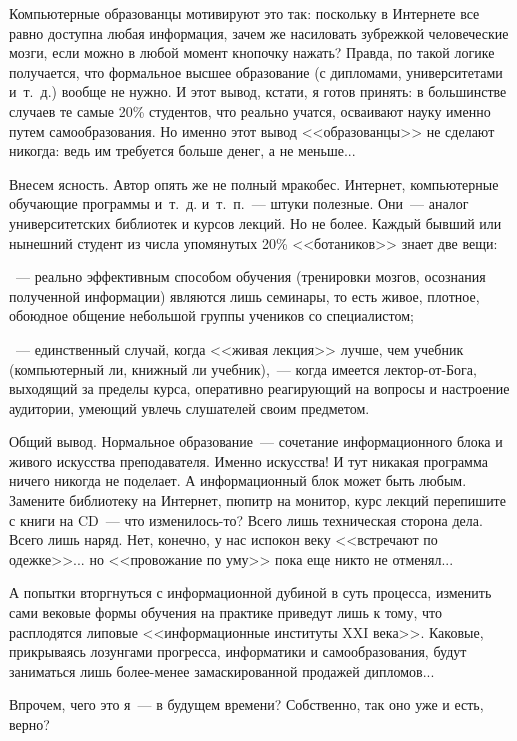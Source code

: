 \documentclass{scrbook}
\newcommand{\flqq}{<<}
\newcommand{\frqq}{>>}
\newcommand{\mdash}{~--- }
\newcommand{\commamdash}{~--- } %
\begin{document}
Компьютерные образованцы мотивируют это так: поскольку в Интернете все равно доступна любая информация, зачем же насиловать зубрежкой человеческие мозги, если можно в любой момент кнопочку нажать? Правда, по такой логике получается, что формальное высшее образование (с дипломами, университетами и~т.~д.) вообще не нужно. И этот вывод, кстати, я готов принять: в большинстве случаев те самые 20\% студентов, что реально учатся, осваивают науку именно путем самообразования. Но именно этот вывод {\flqq}образованцы{\frqq} не сделают никогда: ведь им требуется больше денег, а не меньше...

Внесем ясность. Автор опять же не полный мракобес. Интернет, компьютерные обучающие программы и~т.~д. и~т.~п.{\mdash} штуки полезные. Они{\mdash}аналог университетских библиотек и курсов лекций. Но не более. Каждый бывший или нынешний студент из числа упомянутых 20\% {\flqq}ботаников{\frqq} знает две вещи:

{\mdash} реально эффективным способом обучения (тренировки мозгов, осознания полученной информации) являются лишь семинары, то есть живое, плотное, обоюдное общение небольшой группы учеников со специалистом;

{\mdash} единственный случай, когда {\flqq}живая лекция{\frqq} лучше, чем учебник (компьютерный ли, книжный ли учебник),{\commamdash}когда имеется лектор-от-Бога, выходящий за пределы курса, оперативно реагирующий на вопросы и настроение аудитории, умеющий увлечь слушателей своим предметом.

Общий вывод. Нормальное образование{\mdash}сочетание информационного блока и живого искусства преподавателя. Именно искусства! И тут никакая программа ничего никогда не поделает. А информационный блок может быть любым. Замените библиотеку на Интернет, пюпитр на монитор, курс лекций перепишите с книги на CD{\mdash}что изменилось-то? Всего лишь техническая сторона дела. Всего лишь наряд. Нет, конечно, у нас испокон веку {\flqq}встречают по одежке{\frqq}... но {\flqq}провожание по уму{\frqq} пока еще никто не отменял...

А попытки вторгнуться с информационной дубиной в суть процесса, изменить сами вековые формы обучения на практике приведут лишь к тому, что расплодятся липовые {\flqq}информационные институты XXI века{\frqq}. Каковые, прикрываясь лозунгами прогресса, информатики и самообразования, будут заниматься лишь более-менее замаскированной продажей дипломов...

Впрочем, чего это я{\mdash}в будущем времени? Собственно, так оно уже и есть, верно?
\end{document}
